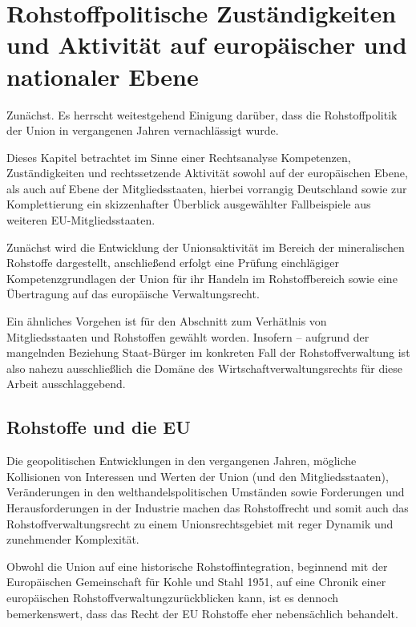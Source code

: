 \documentclass[12pt,a4paper,oneside]{book} %
\begin{document}
	
\chapter{Rohstoffpolitische Zuständigkeiten und Aktivität auf europäischer und nationaler Ebene}
Zunächst. Es herrscht weitestgehend Einigung darüber, dass die Rohstoffpolitik der Union in vergangenen Jahren vernachlässigt wurde.\autocite{Quantz, ZfPC 2024, 1}

Dieses Kapitel betrachtet im Sinne einer Rechtsanalyse Kompetenzen, Zuständigkeiten und rechtssetzende Aktivität sowohl auf der europäischen Ebene, als auch auf Ebene der Mitgliedsstaaten, hierbei vorrangig Deutschland sowie zur Komplettierung ein skizzenhafter Überblick ausgewählter Fallbeispiele aus weiteren EU-Mitgliedsstaaten.	

Zunächst wird die Entwicklung der Unionsaktivität im Bereich der mineralischen Rohstoffe dargestellt, anschließend erfolgt eine Prüfung einchlägiger Kompetenzgrundlagen der Union für ihr Handeln im Rohstoffbereich sowie eine Übertragung auf das europäische Verwaltungsrecht.

Ein ähnliches Vorgehen ist für den Abschnitt zum Verhätlnis von Mitgliedsstaaten und Rohstoffen gewählt worden. Insofern -- aufgrund der mangelnden Beziehung Staat-Bürger im konkreten Fall der Rohstoffverwaltung ist also nahezu ausschließlich die Domäne des Wirtschaftverwaltungsrechts für diese Arbeit ausschlaggebend.
	
\section{Rohstoffe und die EU}

Die geopolitischen Entwicklungen in den vergangenen Jahren, mögliche Kollisionen von Interessen und Werten der Union (und den Mitgliedsstaaten), Veränderungen in den welthandelspolitischen Umständen sowie Forderungen und Herausforderungen in der Industrie machen das Rohstoffrecht und somit auch das Rohstoffverwaltungsrecht zu einem Unionsrechtsgebiet mit reger Dynamik und zunehmender Komplexität.

Obwohl die Union auf eine historische Rohstoffintegration, beginnend mit der Europäischen Gemeinschaft für Kohle und Stahl 1951, auf eine \glqq Chronik einer europäischen Rohstoffverwaltung\glqq zurückblicken kann, ist es dennoch bemerkenswert, dass das Recht der EU Rohstoffe eher nebensächlich behandelt.\autocite{Schorkopf, Europäische Rohstoffverwaltung, Rn. 1}
	
\end{document}
